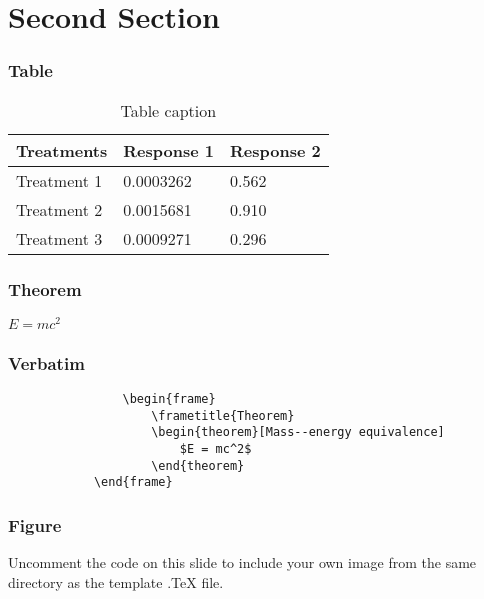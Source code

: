 \documentclass{beamer}
\begin{document}
	\section{Second Section}
	
	\begin{frame}
		\frametitle{Table}
		\begin{table}
			\begin{tabular}{l l l}
				\toprule
				\textbf{Treatments} & \textbf{Response 1} & \textbf{Response 2}\\
				\midrule
				Treatment 1 & 0.0003262 & 0.562 \\
				Treatment 2 & 0.0015681 & 0.910 \\
				Treatment 3 & 0.0009271 & 0.296 \\
				\bottomrule
			\end{tabular}
			\caption{Table caption}
		\end{table}
	\end{frame}
	
	
	\begin{frame}
		\frametitle{Theorem}
		\begin{theorem}
			$E = mc^2$
		\end{theorem}
	\end{frame}
	
	
	\begin{frame}[fragile] %
		\frametitle{Verbatim}
		\begin{example}
			\begin{verbatim}
				\begin{frame}
					\frametitle{Theorem}
					\begin{theorem}[Mass--energy equivalence]
						$E = mc^2$
					\end{theorem}
			\end{frame}\end{verbatim}
		\end{example}
	\end{frame}
	
	
	\begin{frame}
		\frametitle{Figure}
		Uncomment the code on this slide to include your own image from the same directory as the template .TeX file.
	\end{frame}
	
\end{document}

